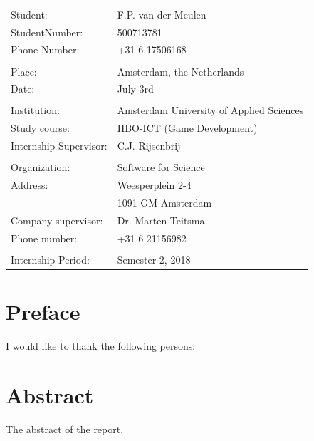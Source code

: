 \documentclass[paper=a4, fontsize=11pt,twoside]{scrartcl}	%
\begin{document}
\newpage 
\begin{longtable}{  p{8cm}  p{8cm} }
Student: & F.P. van der Meulen \\
StudentNumber: & 500713781 \\
Phone Number: & +31 6 17506168 \\
\\
Place: & Amsterdam, the Netherlands \\
Date: & July 3rd \\
\\
Institution: & Amsterdam University of Applied Sciences \\
Study course: & HBO-ICT (Game Development) \\
Internship Supervisor: & C.J. Rijsenbrij \\
\\
Organization: & Software for Science \\
Address: & Weesperplein 2-4 \\
 & 1091 GM Amsterdam \\
Company supervisor: & Dr. Marten Teitsma \\
Phone number: & +31 6 21156982\\
\\
Internship Period: & Semester 2, 2018 

\end{longtable}
\newpage



\newpage
\tableofcontents

\newpage
\section*{Preface}
I would like to thank the following persons:


\newpage
\section*{Abstract}
The abstract of the report.
\newpage
\end{document}
